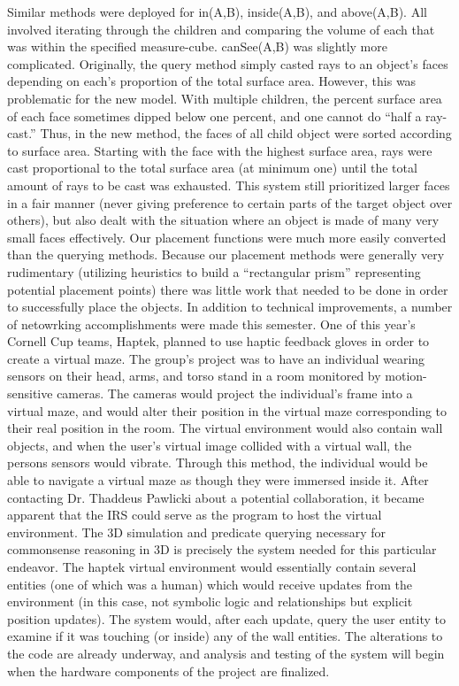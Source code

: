 Similar methods were deployed for in(A,B), inside(A,B), and above(A,B). All involved iterating through the children and comparing the volume of each that was within the specified measure-cube. canSee(A,B) was slightly more complicated. Originally, the query method simply casted rays to an object's faces depending on each's proportion of the total surface area. However, this was problematic for the new model. With multiple children, the percent surface area of each face sometimes dipped below one percent, and one cannot do “half a ray-cast.” Thus, in the new method, the faces of all child object were sorted according to surface area. Starting with the face with the highest surface area, rays were cast proportional to the total surface area (at minimum one) until the total amount of rays to be cast was exhausted. This system still prioritized larger faces in a fair manner (never giving preference to certain parts of the target object over others), but also dealt with the situation where an object is made of many very small faces effectively.
Our placement functions were much more easily converted than the querying methods. Because our placement methods were generally very rudimentary (utilizing heuristics to build a “rectangular prism” representing potential placement points) there was little work that needed to be done in order to successfully place the objects.
In addition to technical improvements, a number of netowrking accomplishments were made this semester. One of this year's Cornell Cup teams, Haptek, planned to use haptic feedback gloves in order to create a virtual maze. The group's project was to have an individual wearing sensors on their head, arms, and torso stand in a room monitored by motion-sensitive cameras. The cameras would project the individual's frame into a virtual maze, and would alter their position in the virtual maze corresponding to their real position in the room. The virtual environment would also contain wall objects, and when the user's virtual image collided with a virtual wall, the persons sensors would vibrate. Through this method, the individual would be able to navigate a virtual maze as though they were immersed inside it.
After contacting Dr. Thaddeus Pawlicki about a potential collaboration, it became apparent that the IRS could serve as the program to host the virtual environment. The 3D simulation and predicate querying necessary for commonsense reasoning in 3D is precisely the system needed for this particular endeavor. The haptek virtual environment would essentially contain several entities (one of which was a human) which would receive updates from the environment (in this case, not symbolic logic and relationships but explicit position updates). The system would, after each update, query the user entity to examine if it was touching (or inside) any of the wall entities. The alterations to the code are already underway, and analysis and testing of the system will begin when the hardware components of the project are finalized.
